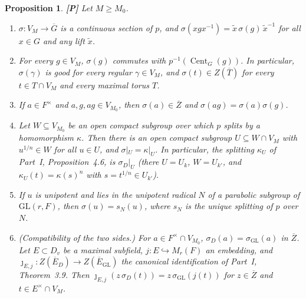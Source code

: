 \documentclass[12pt]{article}
\newcommand{\ov}[1]{\overline{#1}}
\newcommand{\Cent}{\operatorname{Cent}}
\newcommand{\GL}{\mathrm{GL}}
\newcommand{\Gb}{\ov{G}}
\newcommand{\Zb}{\ov{Z}}
\newcommand{\Eb}{\ov{E}}
\newcommand{\Tb}{\ov{T}}
\newcommand{\jj}{\jmath}
\newcommand{\sg}{\sigma}
\newcommand{\Pv}{\textbf{[P]}}
\theoremstyle{plain}
\newtheorem{proposition}[theorem]{Proposition}
\theoremstyle{definition}
\begin{document}
\begin{proposition}\label{prop:section}\Pv
Let $M\ge M_0$.
\begin{enumerate}[label=(\alph*)]
\item $\sg:V_M\to\Gb$ is a continuous section of $p$, and $\sg(xgx^{-1})=\tilde x\,\sg(g)\,\tilde x^{-1}$ for all $x\in G$ and any lift $\tilde x$.
\item For every $g\in V_M$, $\sg(g)$ commutes with $p^{-1}(\Cent_G(g))$. In particular, $\sg(\gamma)$ is good for every regular $\gamma\in V_M$, and $\sg(t)\in Z(\Tb)$ for every $t\in T\cap V_M$ and every maximal torus $T$.
\item If $a\in F^\times$ and $a,g,ag\in V_{M_0}$, then $\sg(a)\in\Zb$ and $\sg(ag)=\sg(a)\sg(g)$.
\item Let $W\subseteq V_{M_0}$ be an open compact subgroup over which $p$ splits by a homomorphism $\kappa$. Then there is an open compact subgroup $U\subseteq W\cap V_M$ with $u^{1/n}\in W$ for all $u\in U$, and $\sg|_U=\kappa|_U$. In particular, the splitting $\kappa_U$ of Part~I, Proposition~4.6, is $\sg_D|_U$ (there $U=U_k$, $W=U_{k'}$, and $\kappa_U(t)=\kappa(s)^n$ with $s=t^{1/n}\in U_{k'}$).
\item If $u$ is unipotent and lies in the unipotent radical $N$ of a parabolic subgroup of $\GL(r,F)$, then $\sg(u)=s_N(u)$, where $s_N$ is the unique splitting of $p$ over $N$.
\item \emph{(Compatibility of the two sides.)} For $a\in F^\times\cap V_{M_0}$, $\sg_D(a)=\sg_{\GL}(a)$ in $\Zb$. Let $E\subset D_v$ be a maximal subfield, $j:E\hookrightarrow M_r(F)$ an embedding, and $\jj_{E,j}:Z(\Eb_D)\to Z(\Eb_{\GL})$ the canonical identification of Part~I, Theorem~3.9. Then $\jj_{E,j}(z\,\sg_D(t))=z\,\sg_{\GL}(j(t))$ for $z\in\Zb$ and $t\in E^\times\cap V_M$.
\end{enumerate}
\end{proposition}
\end{document}
